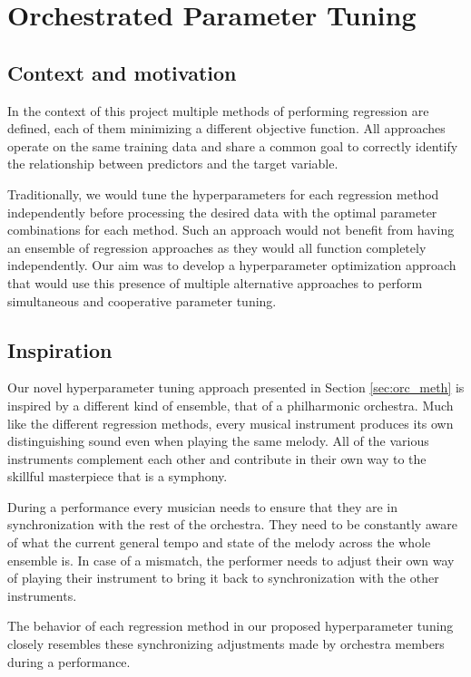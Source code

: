 \section{Orchestrated Parameter Tuning}

\subsection{Context and motivation}
In the context of this project multiple methods of performing regression are defined, each of them minimizing a different objective function. All approaches operate on the same training data and share a common goal to correctly identify the relationship between predictors and the target variable. 

Traditionally, we would tune the hyperparameters for each regression method independently before processing the desired data with the optimal parameter combinations for each method. Such an approach would not benefit from having an ensemble of regression approaches as they would all function completely independently. Our aim was to develop a hyperparameter optimization approach that would use this presence of multiple alternative approaches to perform simultaneous and cooperative parameter tuning.

\subsection{Inspiration}
Our novel hyperparameter tuning approach presented in Section \ref{sec:orc_meth} is inspired by a different kind of ensemble, that of a philharmonic orchestra. Much like the different regression methods, every musical instrument produces its own distinguishing sound even when playing the same melody. All of the various instruments complement each other and contribute in their own way to the skillful masterpiece that is a symphony. 

During a performance every musician needs to ensure that they are in synchronization with the rest of the orchestra. They need to be constantly aware of what the current general tempo and state of the melody across the whole ensemble is. In case of a mismatch, the performer needs to adjust their own way of playing their instrument to bring it back to synchronization with the other instruments.

The behavior of each regression method in our proposed hyperparameter tuning closely resembles these synchronizing adjustments made by orchestra members during a performance.

